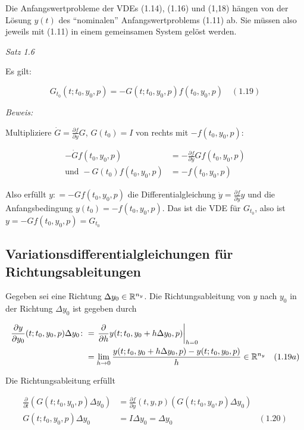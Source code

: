 Die Anfangswertprobleme der VDEs (1.14), (1.16) und (1,18) hängen von der Lösung $y(t)$ des "`nominalen"' Anfangswertproblems (1.11) ab. Sie müssen also jeweils mit (1.11) in einem gemeinsamen System gelöst werden.

\emph{Satz 1.6}

Es gilt:

\[ G_{t_0} (t; t_0, y_0, p) = -G(t; t_0, y_0, p) f(t_0, y_0, p) \quad (1.19) \]

\emph{Beweis:}

Multipliziere $\dot G = \tfrac{\partial f}{\partial y} G$, $G(t_0) = I$ von rechts mit $-f(t_0, y_0, p):$

\begin{align*}
-\dot G f(t_0,y_0,p) &= -\frac{\partial f}{\partial y} G f(t_0, y_0, p) \\
\text{und } -G(t_0) f(t_0, y_0, p) &= -f(t_0, y_0, p)
\end{align*}

Also erfüllt $y \colon= -G f(t_0, y_0, p)$ die Differentialgleichung $\dot y = \tfrac{\partial f}{\partial y} y$ und die Anfangsbedingung $y(t_0) = -f(t_0, y_0, p)$. Das ist die VDE für $G_{t_0}$, also ist $y = -G f(t_0, y_0, p) = G_{t_0}$

\subsection*{Variationsdifferentialgleichungen für Richtungsableitungen}

Gegeben sei eine Richtung $\Delta y_0 \in \mathbb{R}^{n_y}$. Die Richtungsableitung von $y$ nach $y_0$ in der Richtung $\Delta y_0$ ist gegeben durch

\begin{align*}
\frac{\partial y}{\partial y_0} (t; t_0, y_0, p) \Delta y_0 \colon&= \left. \frac \partial{\partial h} y(t; t_0, y_0 + h \Delta y_0, p) \right|_{h=0} \\
&= \lim_{h \to 0} \frac{y(t; t_0, y_0 + h \Delta y_0, p) - y(t; t_0, y_0, p)}{h} \in \mathbb{R}^{n_y} & (1.19a)
\end{align*}

Die Richtungsableitung erfüllt

\begin{align*}
\frac{\partial}{\partial t}(G(t; t_0, y_0, p) \Delta y_0) &= \frac{\partial f}{\partial y} (t,y,p) (G(t;t_0,y_0,p)\Delta y_0) \\
G(t;t_0,y_0,p) \Delta y_0 &= I\Delta y_0 = \Delta y_0 & (1.20)
\end{align*}

